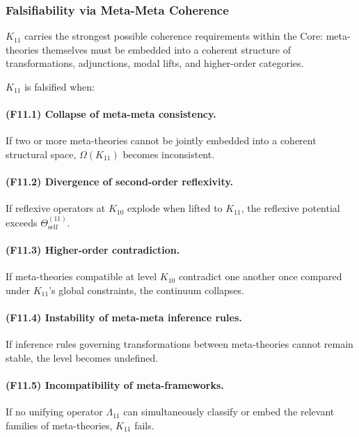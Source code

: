 \subsubsection{Falsifiability via Meta-Meta Coherence}

$K_{11}$ carries the strongest possible coherence requirements within the Core:
meta-theories themselves must be embedded into a coherent structure of
transformations, adjunctions, modal lifts, and higher-order categories.

$K_{11}$ is falsified when:

\paragraph{(F11.1) Collapse of meta-meta consistency.}
If two or more meta-theories cannot be jointly embedded
into a coherent structural space, $\Omega(K_{11})$ becomes inconsistent.

\paragraph{(F11.2) Divergence of second-order reflexivity.}
If reflexive operators at $K_{10}$ explode when lifted to $K_{11}$,
the reflexive potential exceeds $\Theta_{\mathrm{self}}^{(11)}$.

\paragraph{(F11.3) Higher-order contradiction.}
If meta-theories compatible at level $K_{10}$ contradict one another   
once compared under $K_{11}$'s global constraints, the continuum collapses.

\paragraph{(F11.4) Instability of meta-meta inference rules.}
If inference rules governing transformations between
meta-theories cannot remain stable, the level becomes undefined.

\paragraph{(F11.5) Incompatibility of meta-frameworks.}
If no unifying operator $\Lambda_{11}$ can simultaneously classify or embed
the relevant families of meta-theories, $K_{11}$ fails.



